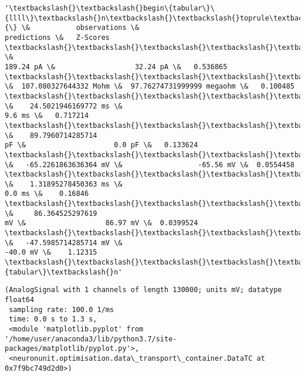 \documentclass[11pt]{article}
\begin{document}
            \begin{tcolorbox}[breakable, size=fbox, boxrule=.5pt, pad at break*=1mm, opacityfill=0]
\begin{Verbatim}[commandchars=\\\{\}]
'\textbackslash{}\textbackslash{}begin\{tabular\}\{llll\}\textbackslash{}n\textbackslash{}\textbackslash{}toprule\textbackslash{}n\{\} \&           observations \&
predictions \&   Z-Scores \textbackslash{}\textbackslash{}\textbackslash{}\textbackslash{}\textbackslash{}n\textbackslash{}\textbackslash{}midrule\textbackslash{}nRheobaseTest                   \&
189.24 pA \&                   32.24 pA \&   0.536865 \textbackslash{}\textbackslash{}\textbackslash{}\textbackslash{}\textbackslash{}nInputResistanceTest
\&  107.080327644332 Mohm \&  97.76274731999999 megaohm \&   0.100485
\textbackslash{}\textbackslash{}\textbackslash{}\textbackslash{}\textbackslash{}nTimeConstantTest               \&    24.5021946169772 ms \&
9.6 ms \&   0.717214 \textbackslash{}\textbackslash{}\textbackslash{}\textbackslash{}\textbackslash{}nCapacitanceTest                \&    89.7960714285714
pF \&                     0.0 pF \&   0.133624 \textbackslash{}\textbackslash{}\textbackslash{}\textbackslash{}\textbackslash{}nRestingPotentialTest
\&   -65.2261863636364 mV \&                  -65.56 mV \&  0.0554458
\textbackslash{}\textbackslash{}\textbackslash{}\textbackslash{}\textbackslash{}nInjectedCurrentAPWidthTest     \&    1.31895278450363 ms \&
0.0 ms \&    0.16846 \textbackslash{}\textbackslash{}\textbackslash{}\textbackslash{}\textbackslash{}nInjectedCurrentAPAmplitudeTest \&     86.364525297619
mV \&                   86.97 mV \&  0.0399524
\textbackslash{}\textbackslash{}\textbackslash{}\textbackslash{}\textbackslash{}nInjectedCurrentAPThresholdTest \&   -47.5985714285714 mV \&
-40.0 mV \&    1.12315 \textbackslash{}\textbackslash{}\textbackslash{}\textbackslash{}\textbackslash{}n\textbackslash{}\textbackslash{}bottomrule\textbackslash{}n\textbackslash{}\textbackslash{}end\{tabular\}\textbackslash{}n'
\end{Verbatim}
\end{tcolorbox}
        
            \begin{tcolorbox}[breakable, size=fbox, boxrule=.5pt, pad at break*=1mm, opacityfill=0]
\begin{Verbatim}[commandchars=\\\{\}]
(AnalogSignal with 1 channels of length 130000; units mV; datatype float64
 sampling rate: 100.0 1/ms
 time: 0.0 s to 1.3 s,
 <module 'matplotlib.pyplot' from '/home/user/anaconda3/lib/python3.7/site-
packages/matplotlib/pyplot.py'>,
 <neuronunit.optimisation.data\_transport\_container.DataTC at 0x7f9bc749d2d0>)
\end{Verbatim}
\end{tcolorbox}
        
\end{document}
